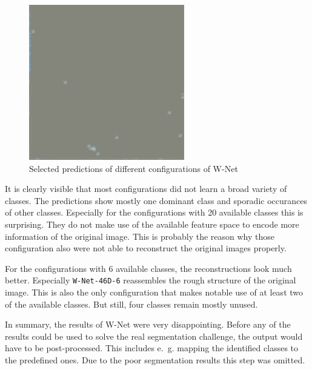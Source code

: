\begin{figure}
    \includegraphics[width=\WnetPredictionsImageWidth]{images/wnet/46d-20/224817-restored}

    \caption{Selected predictions of different configurations of W-Net}
    \label{fig:wnet_prediction_images}
\end{figure}

It is clearly visible that most configurations did not learn a broad variety of classes. The predictions show mostly one dominant class and sporadic occurances of other classes. Especially for the configurations with 20 available classes this is surprising. They do not make use of the available feature space to encode more information of the original image. This is probably the reason why those configuration also were not able to reconstruct the original images properly.

For the configurations with 6 available classes, the reconstructions look much better. Especially \texttt{W-Net-46D-6} reassembles the rough structure of the original image. This is also the only configuration that makes notable use of at least two of the available classes. But still, four classes remain mostly unused.

In summary, the results of W-Net were very disappointing. Before any of the results could be used to solve the real segmentation challenge, the output would have to be post-processed. This includes e.~g. mapping the identified classes to the predefined ones. Due to the poor segmentation results this step was omitted.

